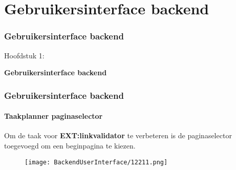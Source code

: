 %

\section{Gebruikersinterface backend}
\begin{frame}[fragile]
	\frametitle{Gebruikersinterface backend}

	\begin{center}\huge{Hoofdstuk 1:}\end{center}
	\begin{center}\huge{\color{typo3darkgrey}\textbf{Gebruikersinterface backend}}\end{center}

\end{frame}

\begin{frame}[fragile]
	\frametitle{Gebruikersinterface backend}
	\framesubtitle{Taakplanner paginaselector}

	Om de taak voor \textbf{EXT:linkvalidator} te verbeteren is de paginaselector
	toegevoegd om een beginpagina te kiezen.

	\begin{figure}\vspace{-0.2cm}
		\texttt{[image: BackendUserInterface/12211.png]}
	\end{figure}

\end{frame}

